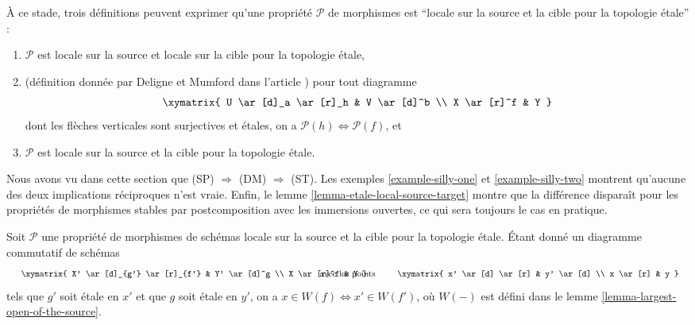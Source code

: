\begin{remark}
\label{remark-compare-definitions}
À ce stade, trois définitions peuvent exprimer qu'une propriété
$\mathcal{P}$ de morphismes est ``locale sur la source et la cible pour la
topologie \'etale'' :
\begin{enumerate}
\item[(ST)] $\mathcal{P}$ est locale sur la source et locale sur la cible pour
la topologie \'etale,
\item[(DM)] (définition donnée par Deligne et Mumford dans l'article
\cite[p.~100]{DM}) pour tout diagramme
$$
\xymatrix{
U \ar[d]_a \ar[r]_h & V \ar[d]^b \\
X \ar[r]^f & Y
}
$$
dont les flèches verticales sont surjectives et étales, on a
$\mathcal{P}(h) \Leftrightarrow \mathcal{P}(f)$, et
\item[(SP)] $\mathcal{P}$ est locale sur la source et la cible pour la
topologie \'etale.
\end{enumerate}
Nous avons vu dans cette section que (SP) $\Rightarrow$ (DM) $\Rightarrow$
(ST). Les exemples \ref{example-silly-one} et \ref{example-silly-two} montrent
qu'aucune des deux implications réciproques n'est vraie. Enfin, le
lemme \ref{lemma-etale-local-source-target} montre que la différence disparaît
pour les propriétés de morphismes stables par postcomposition avec les
immersions ouvertes, ce qui sera toujours le cas en pratique.
\end{remark}

\begin{lemma}
\label{lemma-etale-etale-local-source-target}
Soit $\mathcal{P}$ une propriété de morphismes de schémas locale sur la source
et la cible pour la topologie \'etale. Étant donné un diagramme commutatif
de schémas
$$
\vcenter{
\xymatrix{
X' \ar[d]_{g'} \ar[r]_{f'} & Y' \ar[d]^g \\
X \ar[r]^f & Y
}
}
\quad\text{avec les points}\quad
\vcenter{
\xymatrix{
x' \ar[d] \ar[r] & y' \ar[d] \\
x \ar[r] & y
}
}
$$
tels que $g'$ soit \'etale en $x'$ et que $g$ soit \'etale en $y'$, on a
$x \in W(f) \Leftrightarrow x' \in W(f')$, où $W(-)$ est défini dans le
lemme \ref{lemma-largest-open-of-the-source}.
\end{lemma}

